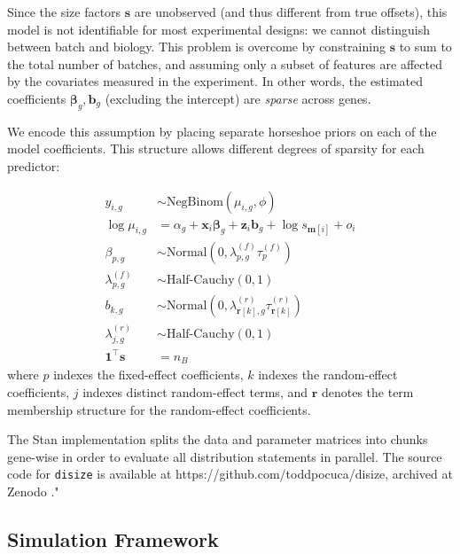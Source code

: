 \documentclass[10pt,letterpaper]{article}
\begin{document}
Since the size factors $\boldsymbol{s}$ are unobserved (and thus different from true offsets), this model is not identifiable for most experimental designs: we cannot distinguish between batch and biology.
This problem is overcome by constraining $\boldsymbol{s}$ to sum to the total number of batches, and assuming only a subset of features are affected by the covariates measured in the experiment. 
In other words, the estimated coefficients $\boldsymbol{\beta}_g, \boldsymbol{b}_g$ (excluding the intercept) are \textit{sparse} across genes.

We encode this assumption by placing separate horseshoe priors \cite{carvalhoHandlingSparsityHorseshoe2009} on each of the model coefficients.
This structure allows different degrees of sparsity for each predictor:

\begin{subequations}
    \begin{align}
        y_{i,g} &\sim \text{NegBinom}(\mu_{i,g}, \phi) \\
        \log \mu_{i,g} &= \alpha_g + \boldsymbol{x}_i \boldsymbol{\beta}_g + \boldsymbol{z}_i \boldsymbol{b}_g + \log s_{\boldsymbol{m}[i]} + o_i \\
        \beta_{p,g} &\sim \text{Normal}(0, \lambda_{p,g}^{(f)} \tau_{p}^{(f)}) \\
        \lambda_{p,g}^{(f)} &\sim \text{Half-Cauchy}(0, 1) \\
        b_{k,g} &\sim \text{Normal}(0, \lambda_{\boldsymbol{r}[k], g}^{(r)} \tau_{\boldsymbol{r}[k]}^{(r)}) \\
        \lambda_{j, g}^{(r)} &\sim \text{Half-Cauchy}(0, 1) \\
        \boldsymbol{1}^\top \boldsymbol{s} &= n_B
    \end{align}
    \label{model}
\end{subequations}
where $p$ indexes the fixed-effect coefficients, $k$ indexes the random-effect coefficients, $j$ indexes distinct random-effect terms, and $\boldsymbol{r}$ denotes the term membership structure for the random-effect coefficients.

The Stan implementation splits the data and parameter matrices into chunks gene-wise in order to evaluate all distribution statements in parallel.
The source code for \texttt{disize} is available at https://github.com/toddpocuca/disize, archived at Zenodo \cite{pocucaToddpocucaDisizeV1012026}."

\subsection*{Simulation Framework}
\end{document}
